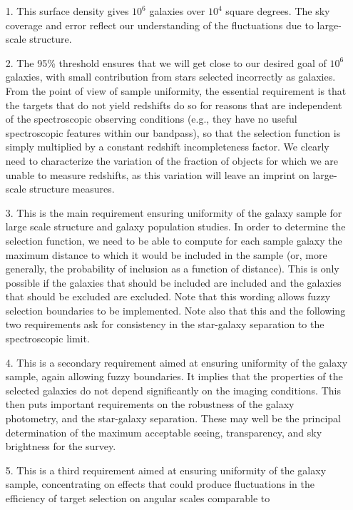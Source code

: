 \begin{enumerate}
\item[1.] This surface density gives $10^6$ galaxies over $10^4$
square degrees.  The sky coverage and error reflect our
understanding of the fluctuations due to large-scale structure. 
\item[2.] The 95\% threshold ensures that we will get close to our
desired goal of $10^6$ galaxies, with small contribution from stars
selected incorrectly as galaxies.  From the point of view of sample
uniformity, the essential requirement is that the targets that do not
yield redshifts do so for reasons that are independent of the spectroscopic
observing conditions (e.g., they have no useful spectroscopic features within
our bandpass), so that the selection function is simply multiplied
by a constant redshift incompleteness factor.  We clearly need to
characterize the variation of the fraction of objects for which we are
unable to measure redshifts, as this variation will leave an imprint
on large-scale structure measures. 
\item[3.] This is the main requirement ensuring uniformity of the galaxy
sample for large scale structure and galaxy population studies.
In order to determine the selection function, we need to be able to compute
for each sample galaxy the maximum distance to which it would be
included in the sample (or, more generally, the probability of
inclusion as a function of distance).  This is only possible if 
the galaxies that should be included are included and the galaxies that 
should be excluded are excluded.  Note that this wording allows fuzzy
selection boundaries to be implemented.  Note also that this and the
following two requirements ask for consistency in the star-galaxy
separation to the spectroscopic limit. 
\item[4.] This is a secondary requirement aimed at ensuring uniformity
of the galaxy sample, again allowing fuzzy boundaries.  It implies
that the properties of the selected  
galaxies do not depend significantly on the imaging conditions.  This
then puts important requirements on the robustness of the galaxy
photometry, and the star-galaxy separation.  These may well be the
principal determination of the maximum acceptable seeing,
transparency, and sky brightness for the survey. 
\item[5.] This is a third requirement aimed at ensuring uniformity of
the galaxy sample, concentrating on effects that could produce fluctuations
in the efficiency of target selection on angular scales comparable to

\end{enumerate}
